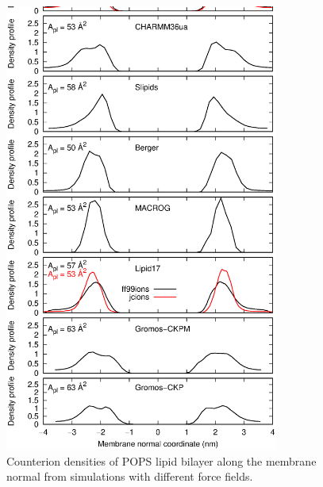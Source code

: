 \documentclass[aps,prl,superscriptaddress,twocolumn]{revtex4}
\begin{document}
\begin{figure}[]
  \centering
  \includegraphics[width=9.0cm]{../Figs/NAdensPOPS.eps}
  \caption{\label{NAdensPOPS}
    Counterion densities of POPS lipid bilayer along the membrane normal from
    simulations with different force fields.
  }
\end{figure}
\end{document}
